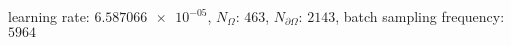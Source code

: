 learning rate: $\num[scientific-notation=true]{6.587066e-05}$, $N_{\Omega}$: $\num[scientific-notation=false]{463}$, $N_{\partial\Omega}$: $\num[scientific-notation=false]{2143}$, batch sampling frequency: $\num[scientific-notation=false]{5964}$
